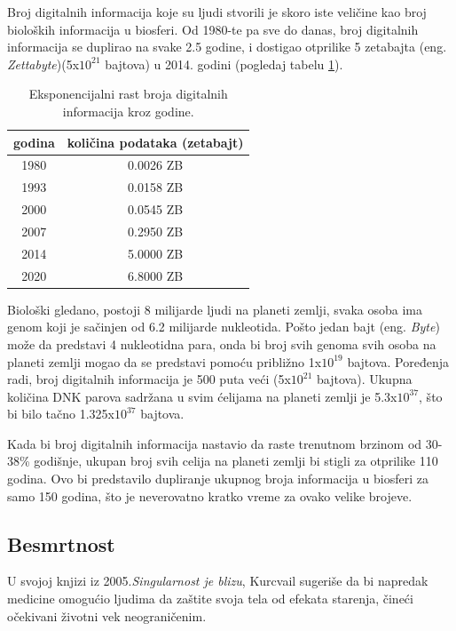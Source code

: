 \documentclass[a4paper]{article}
\begin{document}
\hfill

Broj digitalnih informacija koje su ljudi stvorili je skoro iste veličine kao broj bioloških informacija u biosferi. Od 1980-te pa sve do danas, broj digitalnih informacija se duplirao na svake 2.5 godine, i dostigao otprilike 5 zetabajta (eng. \textit{Zettabyte})(5x$10^{21}$ bajtova) u 2014. godini (pogledaj tabelu \ref{tab:tabela1}).

\begin{table}[h!]
\begin{center}
\begin{tabular}{|c|c|} \hline
\textbf{godina}& \textbf{količina podataka (zetabajt)}\\ \hline
1980 &0.0026 ZB\\ \hline
1993 &0.0158 ZB\\ \hline
2000 &0.0545 ZB\\ \hline
2007 &0.2950 ZB\\ \hline
2014 &5.0000 ZB\\ \hline
2020 &6.8000 ZB\\ \hline
\end{tabular}
\caption{Eksponencijalni rast broja digitalnih informacija kroz godine.}
\label{tab:tabela1}
\end{center}
\end{table}

Biološki gledano, postoji 8 milijarde ljudi na planeti zemlji, svaka osoba ima genom koji je sačinjen od 6.2 milijarde nukleotida. Pošto jedan bajt (eng. \textit{Byte}) može da predstavi 4 nukleotidna para, onda bi broj svih genoma svih osoba na planeti zemlji mogao da se predstavi pomoću približno 1x$10^{19}$ bajtova. Poređenja radi, broj digitalnih informacija je 500 puta veći (5x$10^{21}$ bajtova). Ukupna količina DNK parova sadržana u svim ćelijama na planeti zemlji je 5.3x$10^{37}$, što bi bilo tačno 1.325x$10^{37}$ bajtova.

Kada bi broj digitalnih informacija nastavio da raste trenutnom brzinom od 30-38\% godišnje, ukupan broj svih celija na planeti zemlji bi stigli za otprilike 110 godina. Ovo bi predstavilo dupliranje ukupnog broja informacija u biosferi za samo 150 godina, što je neverovatno kratko vreme za ovako velike brojeve\cite{ref16}.

\subsection{Besmrtnost}
\label{sec:besmrtnost}
U svojoj knjizi iz 2005.\textit {Singularnost je blizu}, Kurcvail sugeriše da bi napredak medicine omogućio ljudima da zaštite svoja tela od efekata starenja, čineći očekivani životni vek neograničenim. 
  
\end{document}
